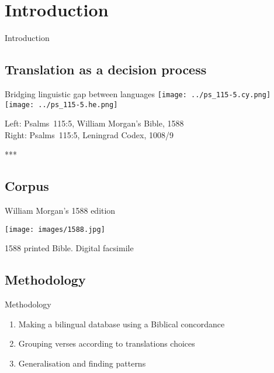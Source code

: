 \setcounter{section}{-1}
\section{Introduction}

\begin{frame}{}
	\begin{center}
		Introduction
	\end{center}
\end{frame}



\subsection{Translation as a decision process}

\begin{frame}{Bridging linguistic gap between languages}
	\texttt{[image: ../ps\_115-5.cy.png]}
	\hfill
	\texttt{[image: ../ps\_115-5.he.png]}

	\vfill

	Left: Psalms~115:5, William Morgan’s Bible, 1588\\
	Right: Psalms~115:5, Leningrad Codex, 1008/9
\end{frame}



\begin{frame}{***}
\end{frame}



\subsection{Corpus}

\begin{frame}{William Morgan’s 1588 edition}
	\begin{center}
		\texttt{[image: images/1588.jpg]}

		\vfill

		1588 printed Bible. Digital facsimile
	\end{center}
\end{frame}



\subsection{Methodology}

\begin{frame}{Methodology}
	\begin{enumerate}
		\item Making a bilingual database using a Biblical concordance
		\item Grouping verses according to translations choices
		\item Generalisation and finding patterns
	\end{enumerate}
\end{frame}



